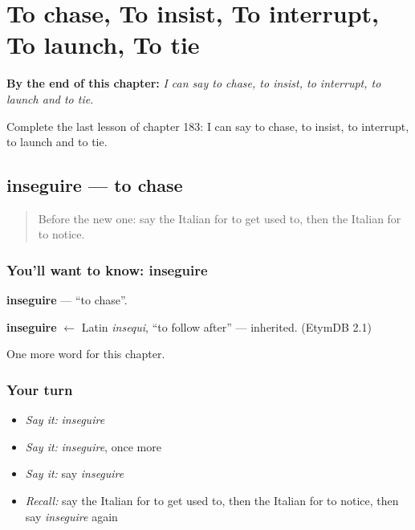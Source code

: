 
\chapter{To chase, To insist, To interrupt, To launch, To tie}
\label{ch:it-to-chase-to-insist-to-interrupt-to-launch-to-tie}

\begin{chapteropening}
\textbf{By the end of this chapter:} \emph{I can say to chase, to insist, to interrupt, to launch and to tie.}

Complete the last lesson of chapter 183: I can say to chase, to insist, to interrupt, to launch and to tie.
\end{chapteropening}

\section[inseguire]{inseguire — to chase}

\label{lesson:IT-C183-inseguire}



\begin{quote}
Before the new one: say the Italian for to get used to, then the Italian for to notice.
\end{quote}

\subsection*{You'll want to know: inseguire}
\textbf{inseguire} — \textquotedblleft{}to chase\textquotedblright{}.

\begin{cousinweb}
\textbf{inseguire} $\leftarrow$ Latin \emph{insequi}, \textquotedblleft{}to follow after\textquotedblright{} — inherited. (EtymDB 2.1)
\end{cousinweb}

\begin{grammarlens}[title={What you've built}]
One more word for this chapter.
\end{grammarlens}

\subsection*{Your turn}
\begin{itemize}
\raggedright
  \item \emph{Say it:} \emph{inseguire}
  \item \emph{Say it:} \emph{inseguire}, once more
  \item \emph{Say it:} say \emph{inseguire}
  \item \emph{Recall:} say the Italian for to get used to, then the Italian for to notice, then say \emph{inseguire} again
\end{itemize}

